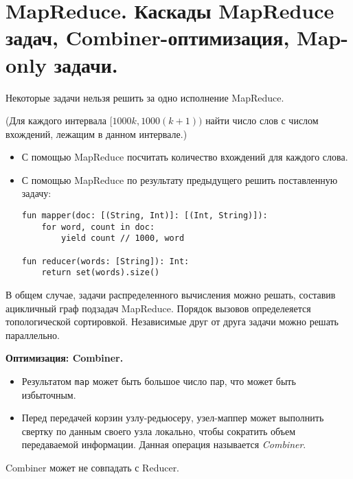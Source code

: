 \section{MapReduce. Каскады MapReduce задач, Combiner-оптимизация, Map-only
  задачи.}

Некоторые задачи нельзя решить за одно исполнение MapReduce.


\begin{example}(Для каждого интервала $[1000k, 1000(k + 1))$ найти число слов с
  числом вхождений, лежащим в данном интервале.)
  \begin{itemize}
    \item С помощью MapReduce посчитать количество вхождений для каждого слова.
    \item С помощью MapReduce по результату предыдущего решить поставленную
      задачу:
      \begin{lstlisting}
fun mapper(doc: [(String, Int)]: [(Int, String)]):
    for word, count in doc:
        yield count // 1000, word

fun reducer(words: [String]): Int:
    return set(words).size()
      \end{lstlisting}
  \end{itemize}
\end{example}

\begin{proposition}
  В общем случае, задачи распределенного вычисления можно решать, составив
  ацикличный граф подзадач MapReduce. Порядок вызовов определеяется
  топологической сортировкой. Независимые друг от друга задачи можно решать
  параллельно.
\end{proposition}

\textbf{Оптимизация: Combiner.}
\begin{itemize}
  \item Результатом \texttt{map} может быть большое число пар, что может быть
    избыточным.
  \item Перед передачей корзин узлу-редьюсеру, узел-маппер может выполнить
    свертку по данным своего узла локально, чтобы сократить объем передаваемой
    информации. Данная операция называется \textit{Combiner}.
\end{itemize}

\begin{remark} Combiner может не совпадать с Reducer.
\end{remark}

